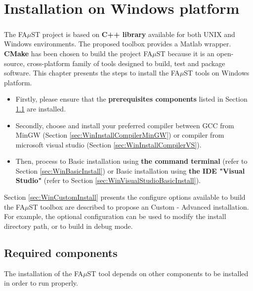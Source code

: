 \chapter{Installation on Windows platform}\label{sec:WinInstall}


\paragraph{}The FA$\mu$ST project is based on \textbf{C++ library} available for both UNIX and Windows environments. The proposed toolbox provides a Matlab wrapper. \textbf{CMake} has been chosen to build the project FA$\mu$ST because it is an open-source, cross-platform family of tools designed to build, test and package software. This chapter presents the steps to install the FA$\mu$ST tools on Windows platform.

\begin{itemize}
\item Firstly, please ensure that the \textbf{prerequisites components} listed in Section \ref{sec:WinRequired} are installed. 
\item Secondly, choose and install your preferred compiler between GCC from MinGW (Section \ref{sec:WinInstallCompilerMinGW}) or compiler from microsoft visual studio (Section \ref{sec:WinInstallCompilerVS}).
\item Then, process to Basic installation using \textbf{the command terminal} (refer to Section \ref{sec:WinBasicInstall}) or Basic installation using \textbf{the IDE "Visual Studio"} (refer to Section \ref{sec:WinVisualStudioBasicInstall}).
\end{itemize}




Section \ref{sec:WinCustomInstall} presents the configure options available to build the FA$\mu$ST toolbox are described to propose an Custom - Advanced installation. For example, the optional configuration can be used to modify the install directory path, or to build in debug mode.  



\section{Required components}\label{sec:WinRequired}
The installation of the FA$\mu$ST tool depends on other components to be installed in order to run properly. 

